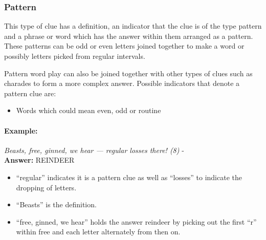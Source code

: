 \subsubsection{Pattern}

This type of clue has a definition, an indicator that the clue is of the type
pattern and a phrase or word which has the answer within them arranged as a
pattern. These patterns can be odd or even letters joined together to make a
word or possibly letters picked from regular intervals.

Pattern word play can also be joined together with other types of clues such as
charades to form a more complex answer. Possible  indicators that denote a
pattern clue are:

\begin{itemize} 
    \item Words which could mean even, odd or routine 
\end{itemize}

\paragraph{Example:} \emph{Beasts, free, ginned, we hear — regular losses there! (8)} - \citep{shuchiPicking09} \\
\textbf{Answer:} REINDEER 

\begin{itemize}
    \item ``regular'' indicates it is a pattern clue as well as ``losses'' to 
    indicate the dropping of letters.
    \item ``Beasts'' is the definition.
    \item ``free, ginned, we hear'' holds the answer reindeer by picking out 
    the first ``r'' within free and each letter alternately from then on.
\end{itemize} 
